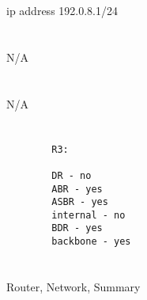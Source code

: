 \documentclass[a4paper, 12pt]{article}
\begin{document}
\section{}
	ip address 192.0.8.1/24

\section{}
	N/A
	

\section{}
	N/A
	
\section{}
	\begin{verbatim}
		R3:
	
		DR - no 
		ABR - yes
		ASBR - yes
		internal - no 
		BDR - yes
		backbone - yes
	\end{verbatim}

\section{}
	Router, Network, Summary
\end{document}
